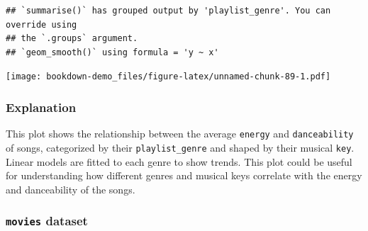 \documentclass[
  b5paper]{book}
\begin{document}
\begin{verbatim}
## `summarise()` has grouped output by 'playlist_genre'. You can override using
## the `.groups` argument.
## `geom_smooth()` using formula = 'y ~ x'
\end{verbatim}

\texttt{[image: bookdown-demo\_files/figure-latex/unnamed-chunk-89-1.pdf]}

\hypertarget{explanation}{%
\subsubsection*{Explanation}\label{explanation}}

This plot shows the relationship between the average \texttt{energy} and \texttt{danceability} of songs, categorized by their \texttt{playlist\_genre} and shaped by their musical \texttt{key}. Linear models are fitted to each genre to show trends. This plot could be useful for understanding how different genres and musical keys correlate with the energy and danceability of the songs.

\hypertarget{movies-dataset-5}{%
\subsubsection*{\texorpdfstring{\texttt{movies} dataset}{movies dataset}}\label{movies-dataset-5}}
\end{document}
